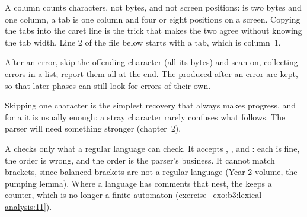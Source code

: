 \label{lst:b3:lexical-analysis:show}

A column counts characters, not bytes, and not screen positions:  is two bytes and one column, a tab is one column and four or eight positions on a screen. Copying the tabs into the caret line is the trick that makes the two agree without knowing the tab width. Line 2 of the file below starts with a tab, which is column~1.

\begin{method}\label{met:b3:lexical-analysis:recover}
After an error, skip the offending character (all its bytes) and scan on, collecting errors in a list; report them all at the end. The  produced after an error are kept, so that later phases can still look for errors of their own.
\end{method}

Skipping one character is the simplest recovery that always makes progress, and for a  it is usually enough: a stray character rarely confuses what follows. The parser will need something stronger (chapter~2).

\label{lst:b3:lexical-analysis:errors}
\label{out:b3:lexical-analysis:errors}

\begin{inpractice}
A  checks only what a regular language can check. It accepts \code{) ) (}, , and : each  is fine, the order is wrong, and the order is the parser's business. It cannot match brackets, since balanced brackets are not a regular language (Year 2 volume, the pumping lemma). Where a language has comments that nest, the  keeps a counter, which is no longer a finite automaton (exercise~\ref{exo:b3:lexical-analysis:11}).
\end{inpractice}

